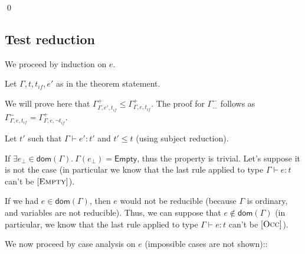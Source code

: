\documentclass[a4paper]{article}%
\newcommand{\dom}[1]{\textsf{dom}(#1)}
\newcommand{\Empty} {\textsf{Empty}}%
\theoremstyle{definition}
\newcommand {\Rule}[1] {[\textsc{#1}]}
\begin{document}
        \qed
    
        \subsection{Test reduction}
    
        We proceed by induction on $e$.
    
        Let $\Gamma,t,t_{if},e'$ as in the theorem statement.
        
        We will prove here that $\Gamma^+_{\Gamma,e',t_{if}} \leq \Gamma^+_{\Gamma,e,t_{if}}$.
        The proof for $\Gamma^-_{\dots}$ follows as $\Gamma^-_{\Gamma,e,t_{if}}=\Gamma^+_{\Gamma,e,\neg t_{if}}$.
    
        Let $t'$ such that $\Gamma \vdash e':t'$ and $t'\leq t$ (using subject reduction).
    
        If $\exists e_{\bot} \in \dom\Gamma.\ \Gamma(e_{\bot}) = \Empty$, thus the property is trivial.
        Let's suppose it is not the case (in particular we know that the last rule applied to type $\Gamma \vdash e:t$ can't be $\Rule{Empty}$).
    
        If we had $e\in\dom\Gamma$, then $e$ would not be reducible (because $\Gamma$ is ordinary, and variables are not reducible).
        Thus, we can suppose that $e\not\in\dom\Gamma$ (in particular, we know that the last rule applied to type $\Gamma \vdash e:t$ can't be $\Rule{Occ}$).
    
        We now proceed by case analysis on $e$ (impossible cases are not shown)::
    
\end{document}
